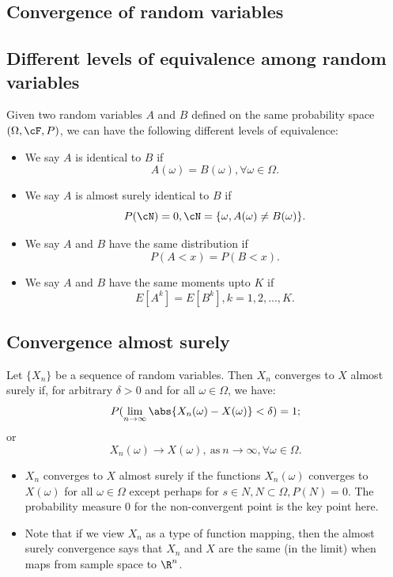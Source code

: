 \begin{refsection}
\section{Convergence of random variables}
\subsection{Different levels of equivalence among random variables}

\begin{remark}[]
Given two random variables $A$ and $B$ defined on the same probability space $(\Omega, \cF, P)$, we can have the following different levels of equivalence:
\begin{itemize}
	\item We say $A$ is identical to $B$ if $$A(\omega) = B(\omega), \forall \omega\in \Omega.$$
	\item We say $A$ is almost surely identical to $B$ if $$P(\cN) = 0, \cN = \{\omega, A(\omega) \neq B(\omega) \}.$$
	\item We say $A$ and $B$ have the same distribution if $$P(A <x) = P(B < x).$$
	\item We say $A$ and $B$ have the same moments upto $K$ if $$E[A^k] = E[B^k], k=1,2,...,K.$$
\end{itemize}
\end{remark}

\subsection{Convergence almost surely}
\begin{definition}
\cite[308]{grimmett2001probability}Let $\{X_n\}$ be a sequence of random variables. Then $X_n$ converges to $X$ almost surely if, for arbitrary $\delta > 0$ and for all $\omega \in \Omega$, we have:
$$P(\lim_{n\rightarrow \infty }\abs{X_n(\omega) - X(\omega)}<\delta) = 1;$$
or
$$X_n(\omega) \to X(\omega), ~\text{as}~ n\to \infty,\forall \omega \in \Omega.$$
\end{definition}

\begin{remark}[interpretation]\hfill
\begin{itemize}
	\item $X_n$ converges to $X$ almost surely if the functions $X_n(\omega)$ converges to $X(\omega)$ for all $\omega \in \Omega$ except perhaps for $s\in N,N\subset \Omega,P(N)=0$. The probability measure 0 for the non-convergent point is the key point here. 
	\item Note that if we view $X_n$ as a type of function mapping, then the almost surely convergence says that $X_n$ and $X$ are the same (in the limit) when maps from sample space to $\R^n$.
\end{itemize}
\end{remark}


\end{refsection}
